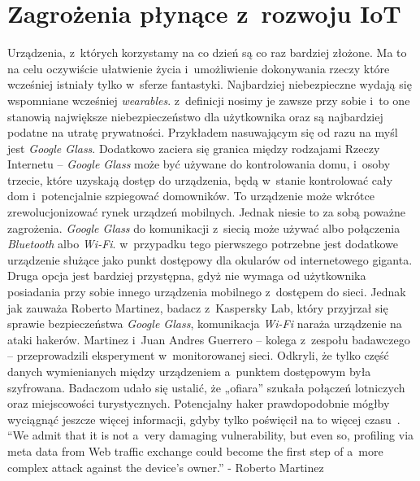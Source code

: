 \documentclass{xmgr}
\begin{document}
\section{Zagrożenia płynące z~rozwoju IoT}
	Urządzenia, z~których korzystamy na co dzień są co raz bardziej złożone. Ma to na celu oczywiście ułatwienie życia i~umożliwienie dokonywania rzeczy które wcześniej istniały tylko w~sferze fantastyki. 
	Najbardziej niebezpieczne wydają się wspomniane wcześniej \emph{wearables}. z~definicji nosimy je zawsze przy sobie i~to one stanowią największe niebezpieczeństwo dla użytkownika oraz są najbardziej podatne na utratę prywatności. Przykładem nasuwającym się od razu na myśl jest \emph{Google Glass}. Dodatkowo zaciera się granica między rodzajami Rzeczy Internetu – \emph{Google Glass} może być używane do kontrolowania domu, i~osoby trzecie, które uzyskają dostęp do urządzenia, będą w~stanie kontrolować cały dom i~potencjalnie szpiegować domowników.
	To urządzenie może wkrótce zrewolucjonizować rynek urządzeń mobilnych. Jednak niesie to za sobą poważne zagrożenia. \emph{Google Glass} do komunikacji z~siecią może używać albo połączenia \emph{Bluetooth} albo \emph{Wi-Fi}. w~przypadku tego pierwszego potrzebne jest dodatkowe urządzenie służące jako punkt dostępowy dla okularów od internetowego giganta. Druga opcja jest bardziej przystępna, gdyż nie wymaga od użytkownika posiadania przy sobie innego urządzenia mobilnego z~dostępem do sieci. Jednak jak zauważa Roberto Martinez, badacz z~Kaspersky Lab, który przyjrzał się sprawie bezpieczeństwa \emph{Google Glass}, komunikacja \emph{Wi-Fi} naraża urządzenie na ataki hakerów. Martinez i~Juan Andres Guerrero – kolega z~zespołu badawczego – przeprowadzili eksperyment w~monitorowanej sieci. Odkryli, że tylko część danych wymienianych między urządzeniem a~punktem dostępowym była szyfrowana. Badaczom udało się ustalić, że „ofiara” szukała połączeń lotniczych oraz miejscowości turystycznych. Potencjalny haker prawdopodobnie mógłby wyciągnąć jeszcze więcej informacji, gdyby tylko poświęcił na to więcej czasu~\cite{Abusing}.
	“We admit that it is not a~very damaging vulnerability, but even so, profiling via meta data from Web traffic exchange could become the first step of a~more complex attack against the device’s owner.” - Roberto Martinez
\end{document}
